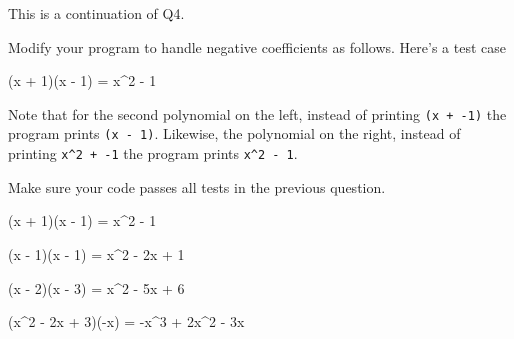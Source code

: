 This is a continuation of Q4.

Modify your program to handle negative coefficients as follows. 
Here's a test case
\begin{console}[commandchars=\\\{\}]
(x + 1)(x - 1) = x^2 - 1
\end{console}
Note that for the second polynomial on the left, instead of printing
\verb!(x + -1)!
the program prints
\verb!(x - 1)!.
Likewise, the polynomial on the right, instead of printing
\verb!x^2 + -1!
the program prints
\verb!x^2 - 1!.

Make sure your code passes all tests in the previous question.

\resett
\nextt
\begin{console}[commandchars=\\\{\}]
(x + 1)(x - 1) = x^2 - 1
\end{console}

\nextt
\begin{console}[commandchars=\\\{\}]
(x - 1)(x - 1) = x^2 - 2x + 1
\end{console}

\nextt
\begin{console}[commandchars=\\\{\}]
(x - 2)(x - 3) = x^2 - 5x + 6
\end{console}

\nextt
\begin{console}[commandchars=\\\{\}]
(x^2 - 2x + 3)(-x) = -x^3 + 2x^2 - 3x
\end{console}
